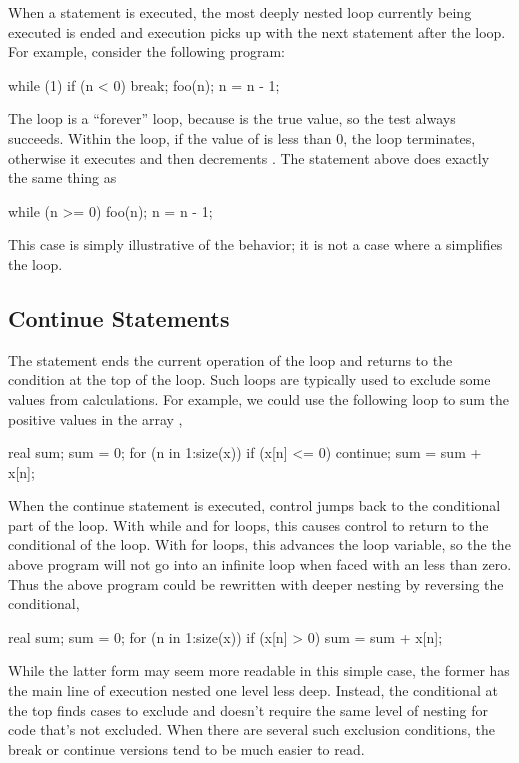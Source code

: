 When a  statement is executed, the most deeply nested loop
currently being executed is ended and execution picks up with the next
statement after the loop.  For example, consider the following
program:
%
\begin{stancode}
while (1) {
  if (n < 0) break;
  foo(n);
  n = n - 1;
}
\end{stancode}
%
The  loop is a ``forever'' loop, because  is
the true value, so the test always succeeds.  Within the loop, if the
value of  is less than 0, the loop terminates, otherwise it
executes  and then decrements .  The statement
above does exactly the same thing as
%
\begin{stancode}
while (n >= 0) {
  foo(n);
  n = n - 1;
}
\end{stancode}
%
This case is simply illustrative of the behavior; it is not a case
where a  simplifies the loop.

\subsection{Continue Statements}

The  statement ends the current operation of the loop
and returns to the condition at the top of the loop.  Such loops are
typically used to exclude some values from calculations.  For example,
we could use the following loop to sum the positive values in the
array ,
%
\begin{stancode}
real sum;
sum = 0;
for (n in 1:size(x)) {
  if (x[n] <= 0) continue;
  sum = sum + x[n];
}
\end{stancode}
%
When the continue statement is executed, control jumps back to the
conditional part of the loop.  With while and for loops, this causes
control to return to the conditional of the loop.  With for loops,
this advances the loop variable, so the the above program will not go
into an infinite loop when faced with an  less than zero.
Thus the above program could be rewritten with deeper nesting by
reversing the conditional,
%
\begin{stancode}
real sum;
sum = 0;
for (n in 1:size(x)) {
  if (x[n] > 0)
    sum = sum + x[n];
}
\end{stancode}
%
While the latter form may seem more readable in this simple case, the
former has the main line of execution nested one level less deep.
Instead, the conditional at the top finds cases to exclude and doesn't
require the same level of nesting for code that's not excluded.  When
there are several such exclusion conditions, the break or continue
versions tend to be much easier to read.

